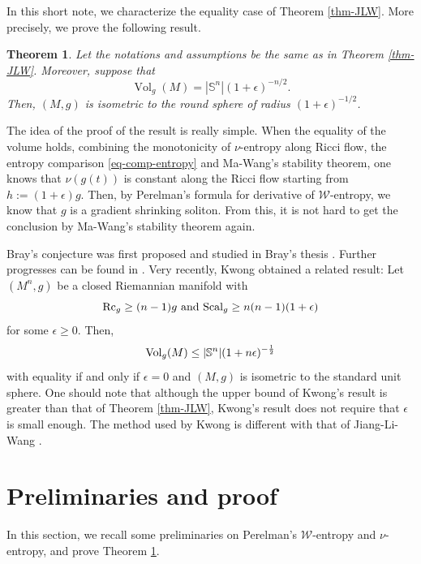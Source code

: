 \documentclass[12pt]{amsart}
\def\Rc{\mbox{Rc}}
\def\Vol{{\rm Vol}}
\def\sph{\mathbb{S}}
\def\e{\epsilon}
\def\Rc{{\rm Rc}}
\def\W{{\mathcal W}}
\def\Scal{{\rm Scal}}
\newtheorem{thm}{Theorem}[section]
\theoremstyle{definition}
\theoremstyle{remark}
\numberwithin{equation}{section}
\begin{document}
In this short note, we characterize the equality case of Theorem \ref{thm-JLW}. More precisely, we prove the following result.
\begin{thm}\label{thm-main}
Let the notations and assumptions be the same as in Theorem \ref{thm-JLW}. Moreover, suppose that  
\[
\operatorname{Vol}_g(M) =|\mathbb{S}^n| (1+\epsilon)^{-n/2}.
\]
Then, $(M,g)$ is isometric to the round sphere of radius $(1+\e)^{-1/2}$.
\end{thm}
The idea of the proof of the result is really simple. When the equality of the volume holds, combining the monotonicity of $\nu$-entropy along Ricci flow, the entropy comparison \eqref{eq-comp-entropy} and Ma-Wang's stability theorem, one knows that $\nu(g(t))$ is constant along the Ricci flow starting from $h:=(1+\e)g$. Then, by Perelman's formula for derivative of $\W$-entropy, we know that $g$ is a gradient shrinking soliton. From this, it is not hard to get the conclusion by Ma-Wang's stability theorem again. 

Bray's conjecture was first proposed and studied in Bray's thesis \cite{Br}. Further progresses can be found in \cite{GV,Bre,Yu,Zh}. Very recently, Kwong \cite{Kw} obtained a related result: Let $(M^n,g)$ be a closed Riemannian manifold with 
$$\Rc_g\geq(n-1)g\mbox{ and }\Scal_g\geq n(n-1)(1+\e)$$
for some $\e\geq0$. Then,
$$\Vol_g(M)\leq |\sph^n|(1+n\e)^{-\frac12}$$
with equality if and only if $\e=0$ and $(M,g)$ is isometric to the standard unit sphere. One should note that although the upper bound of Kwong's result is greater than that of Theorem \ref{thm-JLW}, Kwong's result does not require that $\e$ is small enough. The method used by Kwong \cite{Kw} is different with that of Jiang-Li-Wang \cite{JLW}.
\section{Preliminaries and proof}
In this section, we recall some preliminaries on Perelman's $\W$-entropy and $\nu$-entropy, and prove Theorem \ref{thm-main}.
\end{document}
